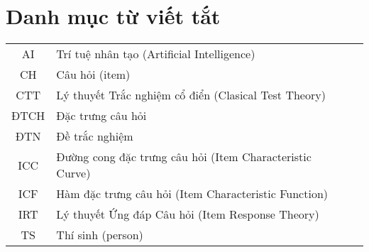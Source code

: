 \chapter*{Danh mục từ viết tắt}
\begin{longtable}{SlSl}
	AI & Trí tuệ nhân tạo (Artificial Intelligence)\\
	CH & Câu hỏi (item)\\
	CTT & Lý thuyết Trắc nghiệm cổ điển (Clasical Test Theory)\\
	ĐTCH & Đặc trưng câu hỏi\\
	ĐTN & Đề trắc nghiệm\\
	ICC & Đường cong đặc trưng câu hỏi (Item Characteristic Curve)\\
	ICF & Hàm đặc trưng câu hỏi (Item Characteristic Function)\\
	IRT & Lý thuyết Ứng đáp Câu hỏi (Item Response Theory)\\
	TS & Thí sinh (person)\\
\end{longtable}
